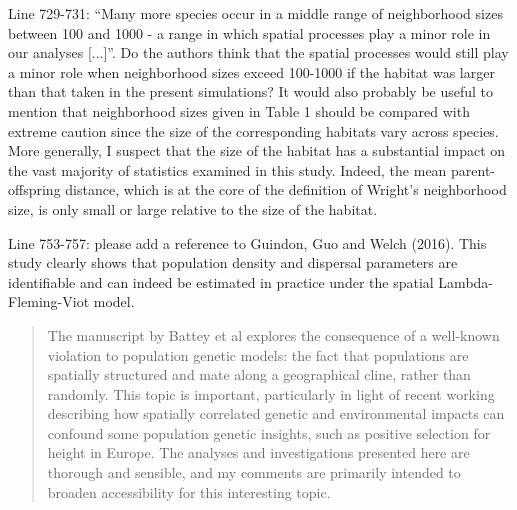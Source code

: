 
\begin{point}{}
    Line 729-731: ``Many more species occur in a middle range of neighborhood sizes between 100 and 1000 - a range in which spatial processes play a minor role in our analyses [...]''. Do the authors think that the spatial processes would still play a minor role when neighborhood sizes exceed 100-1000 if the habitat was larger than that taken in the present simulations? It would also probably be useful to mention that neighborhood sizes given in Table 1 should be compared with extreme caution since the size of the corresponding habitats vary across species. More generally, I suspect that the size of the habitat has a substantial impact on the vast majority of statistics examined in this study. Indeed, the mean parent-offspring distance, which is at the core of the definition of Wright's neighborhood size, is only small or large relative to the size of the habitat.
\end{point}


\begin{point}{}
    Line 753-757: please add a reference to Guindon, Guo and Welch (2016). This study clearly shows that population density and dispersal parameters are identifiable and can indeed be estimated in practice under the spatial Lambda-Fleming-Viot model.
\end{point}





\begin{quote}
    The manuscript by Battey et al explores the consequence of a well-known
    violation to population genetic models: the fact that populations are
    spatially structured and mate along a geographical cline, rather than
    randomly. This topic is important, particularly in light of recent working
    describing how spatially correlated genetic and environmental impacts can
    confound some population genetic insights, such as positive selection for
    height in Europe. The analyses and investigations presented here are
    thorough and sensible, and my comments are primarily intended to broaden
    accessibility for this interesting topic.
\end{quote}

